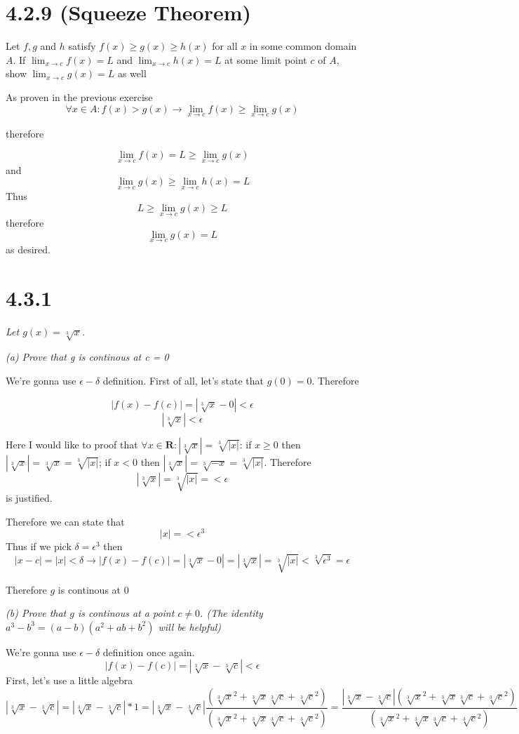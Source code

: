 \documentclass[11pt,oneside,titlepage]{book}
\begin{document}
\section*{4.2.9 (Squeeze Theorem)} Let $f,g$ and $h$ satisfy $f(x) \geq g(x) \geq h(x)$ for all
$x$ in some common domain $A$. If $\lim_{x \to c}f(x) = L$ and $\lim_{x \to c}h(x) = L$ at some
limit point $c$ of  $A$, show $\lim_{x \to c}g(x) = L$ as well

As proven in the previous exercise
$$\forall x \in A: f(x) > g(x) \to \lim_{x \to c} f(x) \geq \lim_{x \to c} g(x) $$

therefore

$$\lim_{x \to c} f(x) = L \geq \lim_{x \to c} g(x) $$
and
$$\lim_{x \to c} g(x) \geq \lim_{x \to c} h(x) = L $$
Thus 
$$ L \geq\lim_{x \to c} g(x) \geq L  $$
therefore
$$\lim_{x \to c} g(x) = L  $$
as desired.

\section*{4.3.1}
\textit{Let $g(x) = \sqrt[3]{x}$.}

\textit{(a) Prove that g is continous at c = 0}

We're gonna use $\epsilon-\delta$ definition. First of all, let's state that $g(0) = 0$. Therefore

$$|f(x) - f(c)| = |\sqrt[3]{x} - 0|  < \epsilon $$
$$ |\sqrt[3]{x}| < \epsilon $$

Here I would like to proof that $ \forall x \in \textbf{R}: |\sqrt[3]{x}| = \sqrt[3]{|x|}$: 
if $x \geq 0$ then $|\sqrt[3]{x}| = \sqrt[3]{x}= \sqrt[3]{|x|}$;
if $x < 0$ then $|\sqrt[3]{x}| = \sqrt[3]{-x}= \sqrt[3]{|x|}$. Therefore 
$$ |\sqrt[3]{x}| = \sqrt[3]{|x|} =  < \epsilon $$ is justified.

Therefore we can state that 
$$|x| =  < \epsilon ^ 3$$ 
Thus if we pick $\delta = \epsilon ^ 3$ then
$$|x - c| = |x| < \delta \to |f(x) - f(c)| = |\sqrt[3]{x} - 0| = |\sqrt[3]{x}|
= \sqrt[3]{|x|} < \sqrt[3]{\epsilon^3} =  \epsilon $$

Therefore $g$ is continous at 0

\textit{(b) Prove that $g$ is continous at a point $c \neq 0$. (The identity
  $a^3 - b^3 = (a - b)(a ^ 2 + ab + b^2)$ will be helpful)}

We're gonna use $\epsilon-\delta$ definition once again.
$$|f(x) - f(c)| = |\sqrt[3]{x} - \sqrt[3]{c}| < \epsilon$$
First, let's use a little algebra
$$|\sqrt[3]{x} - \sqrt[3]{c}| = |\sqrt[3]{x} - \sqrt[3]{c}| * 1 =
|\sqrt[3]{x} - \sqrt[3]{c}|\frac{(\sqrt[3]{x}^2 + \sqrt[3]{x}\sqrt[3]{c} +
  \sqrt[3]{c} ^ 2)}{(\sqrt[3]{x}^2 + \sqrt[3]{x}\sqrt[3]{c}
  + \sqrt[3]{c} ^ 2)} = \frac{|\sqrt[3]{x} - \sqrt[3]{c}|(\sqrt[3]{x}^2 + \sqrt[3]{x}\sqrt[3]{c} +
  \sqrt[3]{c} ^ 2)}{(\sqrt[3]{x}^2 + \sqrt[3]{x}\sqrt[3]{c}
  + \sqrt[3]{c} ^ 2)}$$
\end{document}
